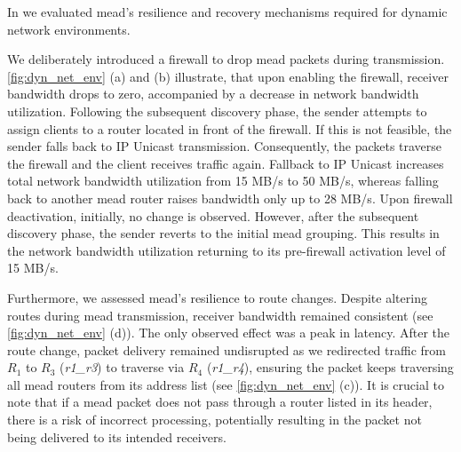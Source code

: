 In \nuciii{} we evaluated \gls{mead}'s resilience and recovery mechanisms
    required for dynamic network environments.

We deliberately introduced a firewall to drop \gls{mead} packets during 
    transmission.
\autoref{fig:dyn_net_env} (a) and (b) illustrate, that upon enabling the firewall,
    receiver bandwidth drops to zero, accompanied by a decrease in network
    bandwidth utilization.
Following the subsequent discovery phase, the sender attempts to assign clients
    to a router located in front of the firewall.
If this is not feasible, the sender falls back to IP Unicast transmission.
Consequently, the packets traverse the firewall and the client receives traffic
    again.
Fallback to IP Unicast increases total network bandwidth utilization from 15
    MB/s to 50 MB/s, whereas falling back to another \gls{mead} router raises
    bandwidth only up to 28 MB/s.
Upon firewall deactivation, initially, no change is observed.
However, after the subsequent discovery phase, the sender reverts to the
    initial \gls{mead} grouping.
This results in the network bandwidth utilization returning to its pre-firewall
    activation level of 15 MB/s.

Furthermore, we assessed \gls{mead}'s resilience to route changes.
Despite altering routes during \gls{mead} transmission, receiver bandwidth
    remained consistent (see \autoref{fig:dyn_net_env} (d)).
The only observed effect was a peak in latency.
After the route change, packet delivery remained undisrupted as we
    redirected traffic from $R_1$ to $R_3$ (\textit{r1\_r3}) to traverse via
    $R_4$ (\textit{r1\_r4}), ensuring the packet keeps traversing all \gls{mead}
    routers from its address list (see \autoref{fig:dyn_net_env} (c)).
It is crucial to note that if a \gls{mead} packet does not pass through a router
    listed in its header, there is a risk of incorrect processing, potentially
    resulting in the packet not being delivered to its intended receivers. 



